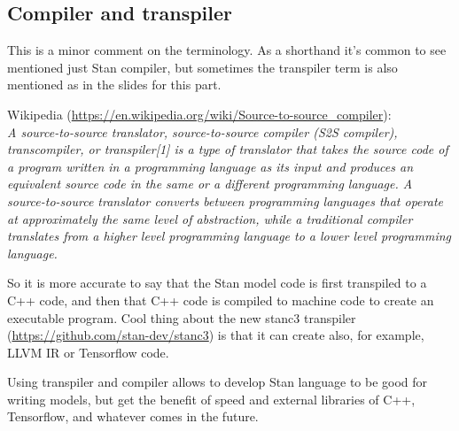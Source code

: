\documentclass[a4paper,11pt,english]{article}
\begin{document}
\subsection*{Compiler and transpiler}

This is a minor comment on the terminology. As a shorthand it's common to see mentioned just Stan compiler, but sometimes the transpiler term is also mentioned as in the slides for this part.

Wikipedia (\url{https://en.wikipedia.org/wiki/Source-to-source_compiler}):\\
\textit{A source-to-source translator, source-to-source compiler (S2S compiler), transcompiler, or transpiler[1] is a type of translator that takes the source code of a program written in a programming language as its input and produces an equivalent source code in the same or a different programming language. A source-to-source translator converts between programming languages that operate at approximately the same level of abstraction, while a traditional compiler translates from a higher level programming language to a lower level programming language.}

So it is more accurate to say that the Stan model code is first transpiled to a C++ code, and then that C++ code is compiled to machine code to create an executable program. Cool thing about the new stanc3 transpiler (\url{https://github.com/stan-dev/stanc3}) is that it can create also, for example, LLVM IR or Tensorflow code.

Using transpiler and compiler allows to develop Stan language to be good for writing models, but get the benefit of speed and external libraries of C++, Tensorflow, and whatever comes in the future.
\end{document}
